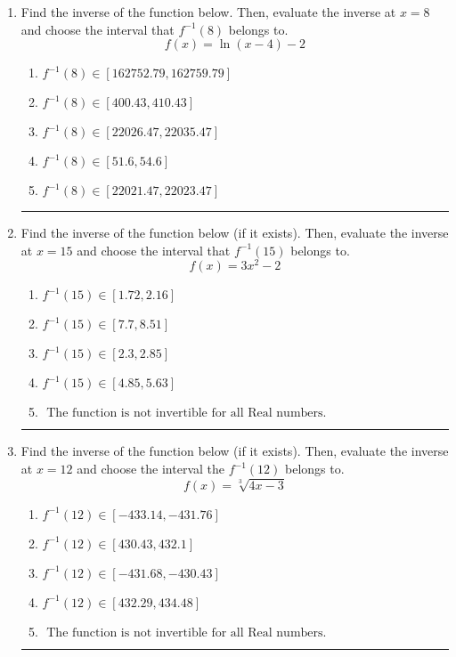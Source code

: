 \documentclass[14pt]{extbook}
\newcommand{\litem}[1]{\item#1\hspace*{-1cm}\rule{\textwidth}{0.4pt}}
\begin{document}
\begin{enumerate}
{\begin{enumerate}[label=\Alph*.]
\end{enumerate} }
\litem{
Find the inverse of the function below. Then, evaluate the inverse at $x = 8$ and choose the interval that $f^{-1}(8)$ belongs to.\[ f(x) = \ln{(x-4)}-2 \]\begin{enumerate}[label=\Alph*.]
\item \( f^{-1}(8) \in [162752.79, 162759.79] \)
\item \( f^{-1}(8) \in [400.43, 410.43] \)
\item \( f^{-1}(8) \in [22026.47, 22035.47] \)
\item \( f^{-1}(8) \in [51.6, 54.6] \)
\item \( f^{-1}(8) \in [22021.47, 22023.47] \)

\end{enumerate} }
\litem{
Find the inverse of the function below (if it exists). Then, evaluate the inverse at $x = 15$ and choose the interval that $f^{-1}(15)$ belongs to.\[ f(x) = 3 x^2 - 2 \]\begin{enumerate}[label=\Alph*.]
\item \( f^{-1}(15) \in [1.72, 2.16] \)
\item \( f^{-1}(15) \in [7.7, 8.51] \)
\item \( f^{-1}(15) \in [2.3, 2.85] \)
\item \( f^{-1}(15) \in [4.85, 5.63] \)
\item \( \text{ The function is not invertible for all Real numbers. } \)

\end{enumerate} }
\litem{
Find the inverse of the function below (if it exists). Then, evaluate the inverse at $x = 12$ and choose the interval the $f^{-1}(12)$ belongs to.\[ f(x) = \sqrt[3]{4 x - 3} \]\begin{enumerate}[label=\Alph*.]
\item \( f^{-1}(12) \in [-433.14, -431.76] \)
\item \( f^{-1}(12) \in [430.43, 432.1] \)
\item \( f^{-1}(12) \in [-431.68, -430.43] \)
\item \( f^{-1}(12) \in [432.29, 434.48] \)
\item \( \text{ The function is not invertible for all Real numbers. } \)


\end{enumerate}}
\end{enumerate}
\end{document}
